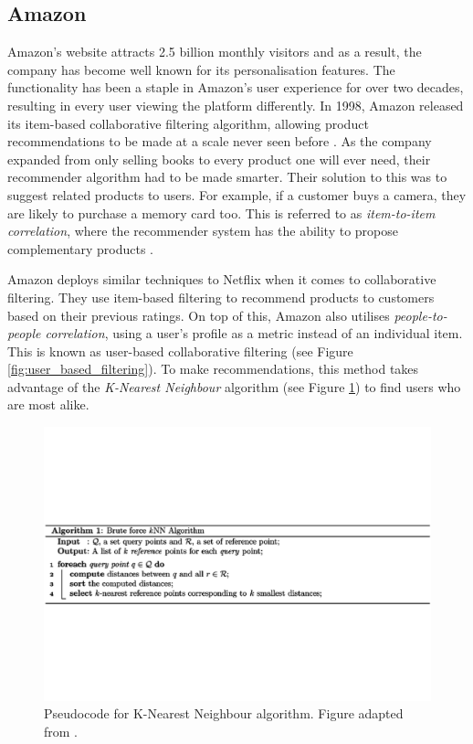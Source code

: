 \documentclass{l4proj}
\begin{document}
\subsection{Amazon}
\label{section:amazon}

Amazon's website attracts 2.5 billion monthly visitors \citep{ecommercestats} and as a result, the company has become well known for its personalisation features. The functionality has been a staple in Amazon's user experience for over two decades, resulting in every user viewing the platform differently. In 1998, Amazon released its item-based collaborative filtering algorithm, allowing product recommendations to be made at a scale never seen before \citep{amazontwodecades}. As the company expanded from only selling books to every product one will ever need, their recommender algorithm had to be made smarter. Their solution to this was to suggest related products to users. For example, if a customer buys a camera, they are likely to purchase a memory card too. This is referred to as \emph{item-to-item correlation}, where the recommender system has the ability to propose complementary products \citep{recommenderecommerce}.

Amazon deploys similar techniques to Netflix when it comes to collaborative filtering. They use item-based filtering to recommend products to customers based on their previous ratings. On top of this, Amazon also utilises \emph{people-to-people correlation}, using a user's profile as a metric instead of an individual item. This is known as user-based collaborative filtering (see Figure \ref{fig:user_based_filtering}). To make recommendations, this method takes advantage of the \emph{K-Nearest Neighbour} algorithm (see Figure \ref{fig:knn}) to find users who are most alike.

\begin{figure}[htb]
    \centering
    \includegraphics[width=0.9\linewidth]{images/knn_pseudocode.pdf}    
    \caption{Pseudocode for K-Nearest Neighbour algorithm. Figure adapted from \cite{knnpseudocode}.}
    \label{fig:knn} 
\end{figure}
\end{document}

